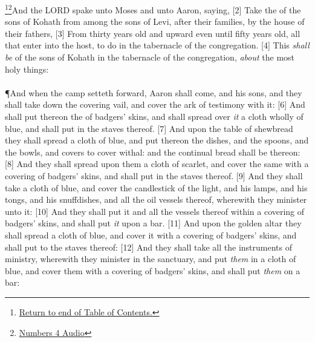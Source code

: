\footnote{\textcolor[cmyk]{0.99998,1,0,0}{\hyperlink{TOC}{Return to end of Table of Contents.}}}\footnote{\href{https://audiobible.com/bible/numbers_4.html}{\textcolor[cmyk]{0.99998,1,0,0}{Numbers 4 Audio}}}\textcolor[cmyk]{0.99998,1,0,0}{And the LORD spake unto Moses and unto Aaron, saying,}
[2] \textcolor[cmyk]{0.99998,1,0,0}{Take the  of the sons of Kohath from among the sons of Levi, after their families, by the house of their fathers,}
[3] \textcolor[cmyk]{0.99998,1,0,0}{From thirty years old and upward even until fifty years old, all that enter into the host, to do  in the tabernacle of the congregation.}
[4] \textcolor[cmyk]{0.99998,1,0,0}{This \emph{shall} \emph{be}  of the sons of Kohath in the tabernacle of the congregation, \emph{about} the most holy things:}\\
\\
\P  \textcolor[cmyk]{0.99998,1,0,0}{And when the camp setteth forward, Aaron shall come, and his sons, and they shall take down the covering vail, and cover the ark of testimony with it:}
[6] \textcolor[cmyk]{0.99998,1,0,0}{And shall put thereon the  of badgers' skins, and shall spread over \emph{it} a cloth wholly of blue, and shall put in the staves thereof.}
[7] \textcolor[cmyk]{0.99998,1,0,0}{And upon the table of shewbread they shall spread a cloth of blue, and put thereon the dishes, and the spoons, and the bowls, and covers to cover withal: and the continual bread shall be thereon:}
[8] \textcolor[cmyk]{0.99998,1,0,0}{And they shall spread upon them a cloth of scarlet, and cover the same with a covering of badgers' skins, and shall put in the staves thereof.}
[9] \textcolor[cmyk]{0.99998,1,0,0}{And they shall take a cloth of blue, and cover the candlestick of the light, and his lamps, and his tongs, and his snuffdishes, and all the oil vessels thereof, wherewith they minister unto it:}
[10] \textcolor[cmyk]{0.99998,1,0,0}{And they shall put it and all the vessels thereof within a covering of badgers' skins, and shall put \emph{it} upon a bar.}
[11] \textcolor[cmyk]{0.99998,1,0,0}{And upon the golden altar they shall spread a cloth of blue, and cover it with a covering of badgers' skins, and shall put to the staves thereof:}
[12] \textcolor[cmyk]{0.99998,1,0,0}{And they shall take all the instruments of ministry, wherewith they minister in the sanctuary, and put \emph{them} in a cloth of blue, and cover them with a covering of badgers' skins, and shall put \emph{them} on a bar:}
